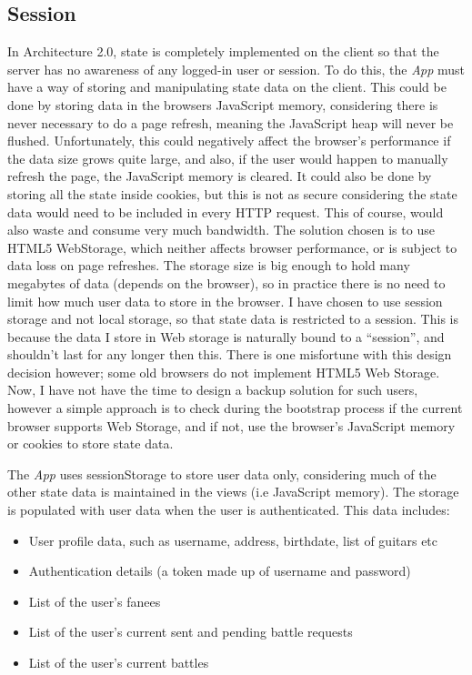 \subsection{Session}
In Architecture 2.0, state is completely implemented on the client so that the server has no awareness of any logged-in user or session. To do this, the \textit{App} must have a way of storing and manipulating state data on the client. This could be done by storing data in the browsers JavaScript memory, considering there is never necessary to do a page refresh, meaning the JavaScript heap will never be flushed.  Unfortunately, this could negatively affect the browser's performance if the data size grows quite large, and also, if the user would happen to manually refresh the page, the JavaScript memory is cleared. It could also be done by storing all the state inside cookies, but this is not as secure considering the state data would need to be included in every HTTP request. This of course, would also waste and consume very much bandwidth. The solution chosen is to use HTML5 WebStorage, which neither affects browser performance, or is subject to data loss on page refreshes. The storage size is big enough to hold many megabytes of data (depends on the browser), so in practice there is no need to limit how much user data to store in the browser. I have chosen to use session storage and not local storage, so that state data is restricted to a session. This is because the data I store in Web storage is naturally bound to a ``session'', and shouldn't last for any longer then this. There is one misfortune with this design decision however; some old browsers do not implement HTML5 Web Storage. Now, I have not have the time to design a backup solution for such users, however a simple approach is to check during the bootstrap process if the current browser supports Web Storage, and if not, use the browser's JavaScript memory or cookies to store state data.

The \textit{App} uses sessionStorage to store user data only, considering much of the other state data is maintained in the views (i.e JavaScript memory). The storage is populated with user data when the user is authenticated. This data includes:

\begin{itemize}
\item{} User profile data, such as username, address, birthdate, list of guitars etc
\item{} Authentication details (a token made up of username and password)
\item{} List of the user's fanees
\item{} List of the user's current sent and pending battle requests 
\item{} List of the user's current battles
\end{itemize}

